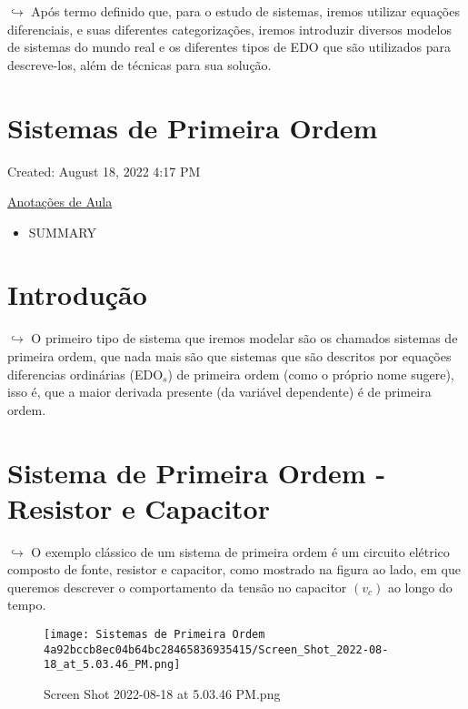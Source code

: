 \documentclass[]{article}
\providecommand{\tightlist}{%
  \setlength{\itemsep}{0pt}\setlength{\parskip}{0pt}}
\begin{document}
  \(\hookrightarrow\) Após termo definido que, para o estudo de sistemas,
  iremos utilizar equações diferenciais, e suas diferentes categorizações,
  iremos introduzir diversos modelos de sistemas do mundo real e os
  diferentes tipos de EDO que são utilizados para descreve-los, além de
  técnicas para sua solução.

  \hypertarget{sistemas-de-primeira-ordem}{%
  \section{Sistemas de Primeira Ordem}\label{sistemas-de-primeira-ordem}}

  Created: August 18, 2022 4:17 PM

  \href{Sistemas\%20de\%20Primeira\%20Ordem\%204a92bccb8ec04b64bc28465836935415/Anotac\%CC\%A7o\%CC\%83es\%20de\%20Aula\%20ae75928b9b3641cf8b22e4fdb1b6b467.md}{Anotações
  de Aula}

  \begin{itemize}
  \tightlist
  \item
    SUMMARY
  \end{itemize}

  \hypertarget{introduuxe7uxe3o-1}{%
  \section{Introdução}\label{introduuxe7uxe3o-1}}

  \(\hookrightarrow\) O primeiro tipo de sistema que iremos modelar são os
  chamados sistemas de primeira ordem, que nada mais são que sistemas que
  são descritos por equações diferencias ordinárias (EDO\(_s\)) de
  primeira ordem (como o próprio nome sugere), isso é, que a maior
  derivada presente (da variável dependente) é de primeira ordem.

  \hypertarget{sistema-de-primeira-ordem---resistor-e-capacitor}{%
  \section{Sistema de Primeira Ordem - Resistor e
  Capacitor}\label{sistema-de-primeira-ordem---resistor-e-capacitor}}

  \(\hookrightarrow\) O exemplo clássico de um sistema de primeira ordem é
  um circuito elétrico composto de fonte, resistor e capacitor, como
  mostrado na figura ao lado, em que queremos descrever o comportamento da
  tensão no capacitor \((v_c)\) ao longo do tempo.

  \begin{figure}
  \centering
  \texttt{[image: Sistemas de Primeira Ordem 4a92bccb8ec04b64bc28465836935415/Screen\_Shot\_2022-08-18\_at\_5.03.46\_PM.png]}
  \caption{Screen Shot 2022-08-18 at 5.03.46 PM.png}
  \end{figure}
\end{document}
